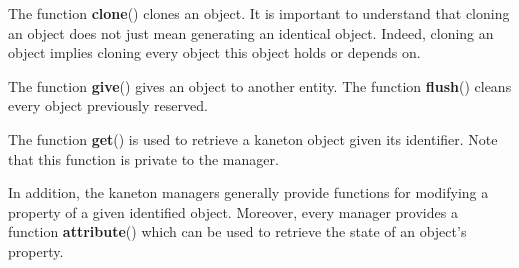 The function \textbf{clone}() clones an object. It is important to understand
that cloning an object does not just mean generating an identical object.
Indeed, cloning an object implies cloning every object this object holds or
depends on.

The function \textbf{give}() gives an object to another entity. The function
\textbf{flush}() cleans every object previously reserved.

The function \textbf{get}() is used to retrieve a kaneton object given its
identifier. Note that this function is private to the manager.

In addition, the kaneton managers generally provide functions for modifying
a property of a given identified object. Moreover, every manager provides
a function \textbf{attribute}() which can be used to retrieve the state
of an object's property.
